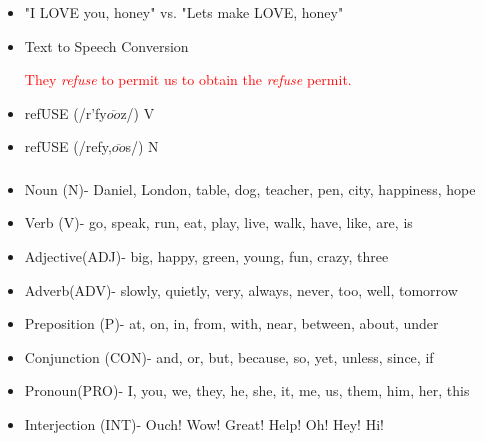 \documentclass[t, 10pt]{beamer}
\begin{document}
	

\begin{frame} %
	\frametitle{\insertsection}
	\frametitle{\insertsubsection}

	
	\vspace{0.5cm}
	
	\begin{itemize}
		\item "I LOVE you, honey" { } vs. "Lets make LOVE, honey"
		\item Text to Speech Conversion
		
		\vspace{0.5cm}
		
		 \textcolor{red}{They \emph{refuse} to permit us to obtain the \emph{refuse} permit.}
	
	\vspace{0.5cm}
	
		\item refUSE  (/r\textschwa 'fy$\overline{oo}$z/) V
		\item refUSE  (/refy,$\overline{oo}$s/) N
	\end{itemize}
\end{frame}	



\begin{frame} %
	\frametitle{\insertsection}
	\frametitle{\insertsubsection}
	
	
	\vspace{0.5cm}
	
	\begin{itemize}
		\item Noun (N)- Daniel, London, table, dog, teacher, pen, city, happiness, hope

		\item Verb (V)- go, speak, run, eat, play, live, walk, have, like, are, is

		\item Adjective(ADJ)- big, happy, green, young, fun, crazy, three
	\item Adverb(ADV)- slowly, quietly, very, always, never, too, well, tomorrow
	\item Preposition (P)- at, on, in, from, with, near, between, about, under
	\item Conjunction (CON)- and, or, but, because, so, yet, unless, since, if
	\item Pronoun(PRO)- I, you, we, they, he, she, it, me, us, them, him, her, this
	\item Interjection (INT)- Ouch! Wow! Great! Help! Oh! Hey! Hi!
	\end{itemize}
\end{frame}	
\end{document}
